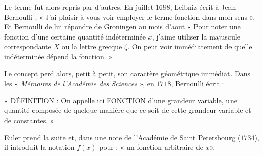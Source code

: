 {\begin{His}
\vspace{0.4cm}
Le terme fut alors repris par d'autres. En juillet $1698$,  Leibniz écrit à  Jean Bernoulli :   «   J'ai   plaisir   à   vous   voir   
employer  le  terme  fonction  dans  mon  sens  ».  Et  Bernoulli  de  lui  répondre  de  Groningen  au  mois  d'aout  «  Pour  noter  
une   fonction   d'une   certaine   quantité indéterminée $x$, j'aime  utiliser  la majuscule  correspondante  $X$  ou  la lettre  grecque $\zeta$. On peut voir immédiatement de quelle indéterminée dépend la fonction. » 

\vspace{0.4cm}

Le  concept  perd  alors,  petit  à  petit,  son  caractère géométrique immédiat. Dans  les  « \textit{ Mémoires  de  l'Académie  des 
Sciences} », en $1718$, Bernoulli écrit : 

« DÉFINITION  :    On  appelle  ici FONCTION  d'une  grandeur  variable, une   quantité   composée   de   quelque   manière  que  ce  soit  de  cette  grandeur  variable et de constantes. » 

\vspace{0.4cm}

Euler prend la suite et, dans une note de l’Académie de Saint Petersbourg ($1734$), il  introduit  la  notation  $f\left(x \right)$ pour : « un fonction arbitraire de $x$».
 \end{His}

}




